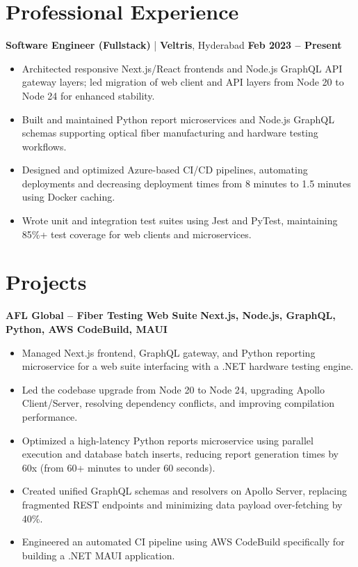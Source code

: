 \documentclass[a4paper,10pt]{article}
\begin{document}
\section{Professional Experience}
\noindent\textbf{Software Engineer (Fullstack)} | \textbf{Veltris}, Hyderabad \hfill \textbf{Feb 2023 -- Present}
\begin{itemize}
    \item Architected responsive Next.js/React frontends and Node.js GraphQL API gateway layers; led migration of web client and API layers from Node 20 to Node 24 for enhanced stability.
    \item Built and maintained Python report microservices and Node.js GraphQL schemas supporting optical fiber manufacturing and hardware testing workflows.
    \item Designed and optimized Azure-based CI/CD pipelines, automating deployments and decreasing deployment times from 8 minutes to 1.5 minutes using Docker caching.
    \item Wrote unit and integration test suites using Jest and PyTest, maintaining 85\%+ test coverage for web clients and microservices.
\end{itemize}

\section{Projects}
\noindent\textbf{AFL Global -- Fiber Testing Web Suite} \hfill \textbf{Next.js, Node.js, GraphQL, Python, AWS CodeBuild, MAUI}
\begin{itemize}
    \item Managed Next.js frontend, GraphQL gateway, and Python reporting microservice for a web suite interfacing with a .NET hardware testing engine.
    \item Led the codebase upgrade from Node 20 to Node 24, upgrading Apollo Client/Server, resolving dependency conflicts, and improving compilation performance.
    \item Optimized a high-latency Python reports microservice using parallel execution and database batch inserts, reducing report generation times by 60x (from 60+ minutes to under 60 seconds).
    \item Created unified GraphQL schemas and resolvers on Apollo Server, replacing fragmented REST endpoints and minimizing data payload over-fetching by 40\%.
    \item Engineered an automated CI pipeline using AWS CodeBuild specifically for building a .NET MAUI application.
\end{itemize}
\end{document}
